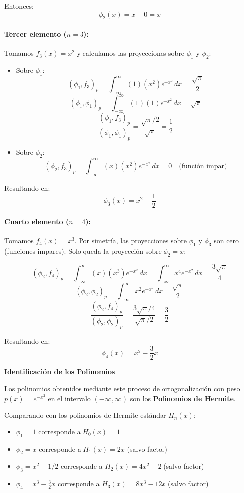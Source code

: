 \documentclass[a4paper]{article}
\begin{document}
Entonces:
$$\phi_2(x) = x - 0 = x$$

\paragraph{Tercer elemento ($n=3$):}
Tomamos $f_3(x) = x^2$ y calculamos las proyecciones sobre $\phi_1$ y $\phi_2$:

\begin{itemize}
    \item Sobre $\phi_1$: 
    $$(\phi_1, f_3)_p = \int_{-\infty}^{\infty} (1)(x^2) e^{-x^2} \, dx = \frac{\sqrt{\pi}}{2}$$
    $$(\phi_1, \phi_1)_p = \int_{-\infty}^{\infty} (1)(1) e^{-x^2} \, dx = \sqrt{\pi}$$
    $$\frac{(\phi_1, f_3)_p}{(\phi_1, \phi_1)_p} = \frac{\sqrt{\pi}/2}{\sqrt{\pi}} = \frac{1}{2}$$
    
    \item Sobre $\phi_2$: 
    $$(\phi_2, f_3)_p = \int_{-\infty}^{\infty} (x)(x^2) e^{-x^2} \, dx = 0 \quad \text{(función impar)}$$
\end{itemize}

Resultando en:
$$\phi_3(x) = x^2 - \frac{1}{2}$$

\paragraph{Cuarto elemento ($n=4$):}
Tomamos $f_4(x) = x^3$. Por simetría, las proyecciones sobre $\phi_1$ y $\phi_3$ son cero (funciones impares). Solo queda la proyección sobre $\phi_2 = x$:

$$(\phi_2, f_4)_p = \int_{-\infty}^{\infty} (x)(x^3) e^{-x^2} \, dx = \int_{-\infty}^{\infty} x^4 e^{-x^2} \, dx = \frac{3\sqrt{\pi}}{4}$$
$$(\phi_2, \phi_2)_p = \int_{-\infty}^{\infty} x^2 e^{-x^2} \, dx = \frac{\sqrt{\pi}}{2}$$
$$\frac{(\phi_2, f_4)_p}{(\phi_2, \phi_2)_p} = \frac{3\sqrt{\pi}/4}{\sqrt{\pi}/2} = \frac{3}{2}$$

Resultando en:
$$\phi_4(x) = x^3 - \frac{3}{2}x$$

\textbf{Identificación de los Polinomios}

Los polinomios obtenidos mediante este proceso de ortogonalización con peso $p(x) = e^{-x^2}$ en el intervalo $(-\infty, \infty)$ son los \textbf{Polinomios de Hermite}.

Comparando con los polinomios de Hermite estándar $H_n(x)$:

\begin{itemize}
    \item $\phi_1 = 1$ corresponde a $H_0(x) = 1$
    \item $\phi_2 = x$ corresponde a $H_1(x) = 2x$ (salvo factor)
    \item $\phi_3 = x^2 - 1/2$ corresponde a $H_2(x) = 4x^2 - 2$ (salvo factor)
    \item $\phi_4 = x^3 - \frac{3}{2}x$ corresponde a $H_3(x) = 8x^3 - 12x$ (salvo factor)
\end{itemize}
\end{document}
